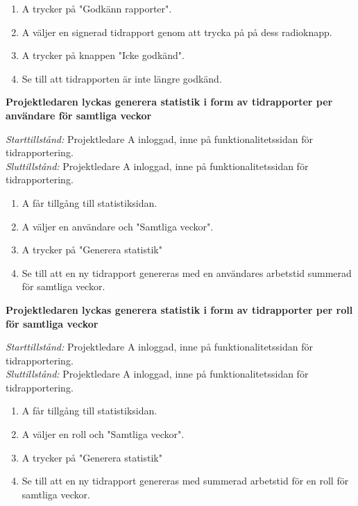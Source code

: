 \documentclass[a4paper]{article}
\begin{document}
\begin{FT}
\begin{enumerate}
\item A trycker på "Godkänn rapporter".
\item A väljer en signerad tidrapport genom att trycka på på dess radioknapp.
\item A trycker på knappen "Icke godkänd".
\item Se till att tidrapporten är inte längre godkänd.
\end{enumerate}



\item
\textbf{Projektledaren lyckas generera statistik i form av tidrapporter per användare för samtliga veckor}

\emph{Starttillstånd:} Projektledare A inloggad, inne på funktionalitetssidan för tidrapportering.\\
\emph{Sluttillstånd:} Projektledare A inloggad, inne på funktionalitetssidan för tidrapportering.

\begin{enumerate}
\item A får tillgång till statistiksidan.
\item A väljer en användare och "Samtliga veckor".
\item A trycker på "Generera statistik"
\item Se till att en ny tidrapport genereras med en användares arbetstid summerad för samtliga veckor.
\end{enumerate}



\item
\textbf{Projektledaren lyckas generera statistik i form av tidrapporter per roll för samtliga veckor}

\emph{Starttillstånd:} Projektledare A inloggad, inne på funktionalitetssidan för tidrapportering.\\
\emph{Sluttillstånd:} Projektledare A inloggad, inne på funktionalitetssidan för tidrapportering.

\begin{enumerate}
\item A får tillgång till statistiksidan.
\item A väljer en roll och "Samtliga veckor".
\item A trycker på "Generera statistik"
\item Se till att en ny tidrapport genereras med summerad arbetstid för en roll för samtliga veckor.
\end{enumerate}



\end{FT}
\end{document}
